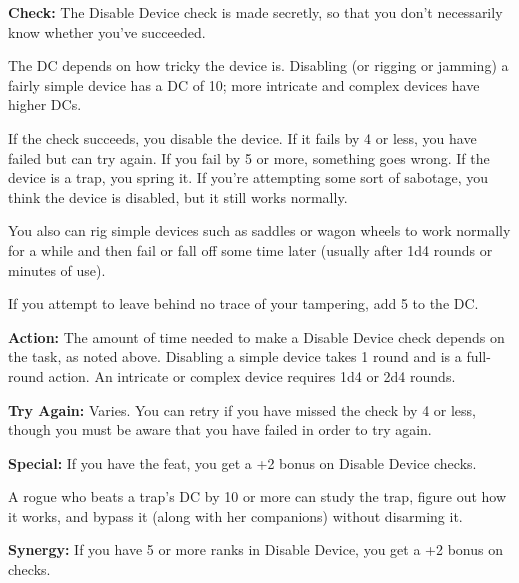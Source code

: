 \textbf{Check:} The Disable Device check is made secretly, so that you don't necessarily know whether you've succeeded.

The DC depends on how tricky the device is. Disabling (or rigging or jamming) a fairly simple device has a DC of 10; more intricate and complex devices have higher DCs.

If the check succeeds, you disable the device. If it fails by 4 or less, you have failed but can try again. If you fail by 5 or more, something goes wrong. If the device is a trap, you spring it. If you're attempting some sort of sabotage, you think the device is disabled, but it still works normally.

You also can rig simple devices such as saddles or wagon wheels to work normally for a while and then fail or fall off some time later (usually after 1d4 rounds or minutes of use).


If you attempt to leave behind no trace of your tampering, add 5 to the DC.

\textbf{Action:} The amount of time needed to make a Disable Device check depends on the task, as noted above. Disabling a simple device takes 1 round and is a full-round action. An intricate or complex device requires 1d4 or 2d4 rounds.

\textbf{Try Again:} Varies. You can retry if you have missed the check by 4 or less, though you must be aware that you have failed in order to try again.

\textbf{Special:} If you have the  feat, you get a +2 bonus on Disable Device checks.

A rogue who beats a trap's DC by 10 or more can study the trap, figure out how it works, and bypass it (along with her companions) without disarming it.

\textbf{Synergy:}  If you have 5 or more ranks in Disable Device, you get a +2 bonus on  checks.

